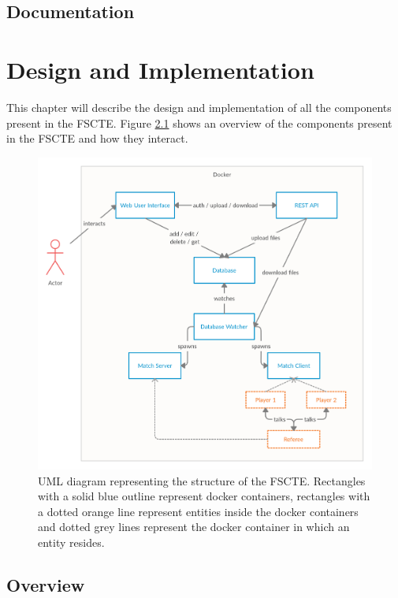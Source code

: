 \documentclass[a4paper, 11pt]{report}
\begin{document}
\section{Documentation}

\chapter{Design and Implementation}
\label{chap:design}

This chapter will describe the design and implementation of all the components
present in the FSCTE. Figure \ref{fig:uml-structure} shows an overview of the
components present in the FSCTE and how they interact.
\begin{figure}[H]
	\centering
	\includegraphics[scale=0.238]{uml-structure.png}
	\caption{UML diagram representing the structure of the FSCTE. Rectangles
	with a solid blue outline represent docker containers, rectangles with a
	dotted orange line represent entities inside the docker containers and dotted
	grey lines represent the docker container in which an entity resides.}
	\label{fig:uml-structure}
\end{figure}

\section{Overview}
\label{sec:impl-overview}
\end{document}
